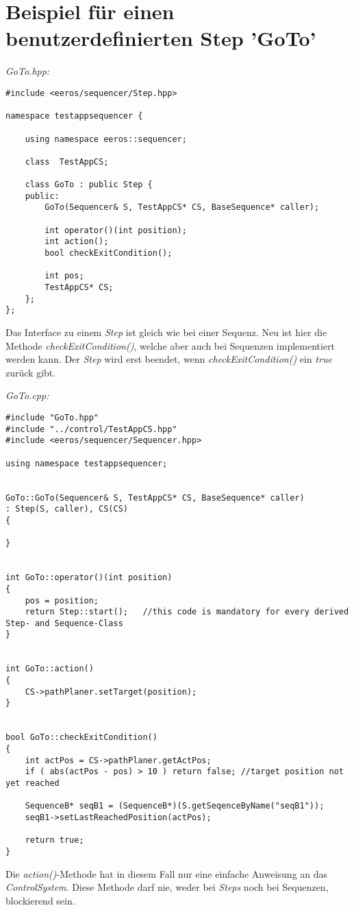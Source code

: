 \section{Beispiel für einen benutzerdefinierten Step 'GoTo'}

\textit{GoTo.hpp:}\
\begin{lstlisting}
#include <eeros/sequencer/Step.hpp>

namespace testappsequencer {
	
	using namespace eeros::sequencer;
	
	class  TestAppCS;
	
	class GoTo : public Step {
	public:
		GoTo(Sequencer& S, TestAppCS* CS, BaseSequence* caller);
		
		int operator()(int position);
		int action();
		bool checkExitCondition();
		
		int pos;
		TestAppCS* CS;
	};
};
\end{lstlisting}

Das Interface zu einem \textit{Step} ist gleich wie bei einer Sequenz.
Neu ist hier die Methode \textit{checkExitCondition()}, welche aber auch bei Sequenzen implementiert werden kann.
Der \textit{Step} wird erst beendet, wenn \textit{checkExitCondition()} ein \textit{true} zurück gibt.


\textit{GoTo.cpp:}\
\begin{lstlisting}
#include "GoTo.hpp"
#include "../control/TestAppCS.hpp"
#include <eeros/sequencer/Sequencer.hpp>

using namespace testappsequencer;


GoTo::GoTo(Sequencer& S, TestAppCS* CS, BaseSequence* caller)
: Step(S, caller), CS(CS)
{
	
}


int GoTo::operator()(int position)
{
	pos = position;
	return Step::start();	//this code is mandatory for every derived Step- and Sequence-Class
}


int GoTo::action()
{	
 	CS->pathPlaner.setTarget(position);
}


bool GoTo::checkExitCondition()
{
	int actPos = CS->pathPlaner.getActPos;
	if ( abs(actPos - pos) > 10 ) return false;	//target position not yet reached
	
	SequenceB* seqB1 = (SequenceB*)(S.getSeqenceByName("seqB1"));
	seqB1->setLastReachedPosition(actPos);
	
	return true;
}
\end{lstlisting}

Die \textit{action()}-Methode hat in diesem Fall nur eine einfache Anweisung an das \textit{ControlSystem}.
Diese Methode darf nie, weder bei \textit{Steps} noch bei Sequenzen, blockierend sein.

